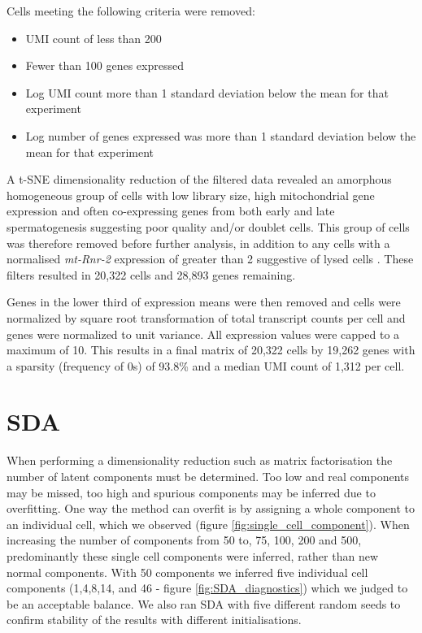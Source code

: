 Cells meeting the following criteria were removed:
\begin{itemize}
\item UMI count of less than 200
\item Fewer than 100 genes expressed
\item Log UMI count more than 1 standard deviation below the mean for that experiment
\item Log number of genes expressed was more than 1 standard deviation below the mean for that experiment
\end{itemize}

A t-SNE dimensionality reduction of the filtered data revealed an amorphous homogeneous group of cells with low library size, high mitochondrial gene expression and often co-expressing genes from both early and late spermatogenesis suggesting poor quality and/or doublet cells. This group of cells was therefore removed before further analysis, in addition to any cells with a normalised \textit{mt-Rnr-2} expression of greater than 2 suggestive of lysed cells \parencite{Ilicic2016Classification}. These filters resulted in 20,322 cells and 28,893 genes remaining.

Genes in the lower third of expression means were then removed and cells were normalized by square root transformation of total transcript counts per cell and genes were normalized to unit variance. All expression values were capped to a maximum of 10. This results in a final matrix of 20,322 cells by 19,262 genes with a sparsity (frequency of 0s) of 93.8\% and a median UMI count of 1,312 per cell.


\section{SDA}

When performing a dimensionality reduction such as matrix factorisation the number of latent components must be determined. Too low and real components may be missed, too high and spurious components may be inferred due to overfitting. One way the method can overfit is by assigning a whole component to an individual cell, which we observed (figure \ref{fig:single_cell_component}). When increasing the number of components from 50 to, 75, 100, 200 and 500, predominantly these single cell components were inferred, rather than new normal components. With 50 components we inferred five individual cell components (1,4,8,14, and 46 - figure \ref{fig:SDA_diagnostics}) which we judged to be an acceptable balance. We also ran SDA with five different random seeds to confirm stability of the results with different initialisations.


